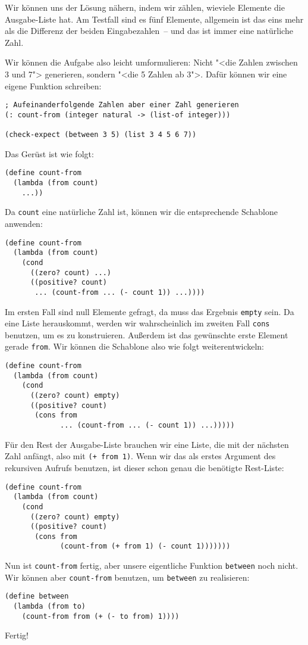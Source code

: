 Wir können uns der Lösung nähern, indem wir zählen, wieviele Elemente
die Ausgabe-Liste hat.  Am Testfall sind es fünf Elemente, allgemein
ist das eins mehr als die Differenz der beiden Eingabezahlen~-- und
das ist immer eine natürliche Zahl.

Wir können die Aufgabe also leicht umformulieren: Nicht "<die Zahlen
zwischen 3 und 7"> generieren, sondern "<die 5 Zahlen ab 3">.  Dafür
können wir eine eigene Funktion schreiben:
%
\begin{lstlisting}
; Aufeinanderfolgende Zahlen aber einer Zahl generieren
(: count-from (integer natural -> (list-of integer)))

(check-expect (between 3 5) (list 3 4 5 6 7))
\end{lstlisting}
%
Das Gerüst ist wie folgt:
%
\begin{lstlisting}
(define count-from
  (lambda (from count)
    ...))
\end{lstlisting}
%
Da \lstinline{count} eine natürliche Zahl ist, können wir die
entsprechende Schablone anwenden:
%
\begin{lstlisting}
(define count-from
  (lambda (from count)
    (cond
      ((zero? count) ...)
      ((positive? count)
       ... (count-from ... (- count 1)) ...))))
\end{lstlisting}
%
Im ersten Fall sind null Elemente gefragt, da muss das Ergebnis
\lstinline{empty} sein.  Da eine Liste herauskommt, werden wir
wahrscheinlich im zweiten Fall \lstinline{cons} benutzen, um es zu
konstruieren.  Außerdem ist das gewünschte erste Element gerade
\lstinline{from}.  Wir können die Schablone also wie folgt
weiterentwickeln:
%
\begin{lstlisting}
(define count-from
  (lambda (from count)
    (cond
      ((zero? count) empty)
      ((positive? count)
       (cons from
             ... (count-from ... (- count 1)) ...)))))
\end{lstlisting}
%
Für den Rest der Ausgabe-Liste brauchen wir eine Liste, die mit der
nächsten Zahl anfängt, also mit \lstinline{(+ from 1)}.  Wenn wir das
als erstes Argument des rekursiven Aufrufs benutzen, ist dieser schon
genau die benötigte Rest-Liste:
%
\begin{lstlisting}
(define count-from
  (lambda (from count)
    (cond
      ((zero? count) empty)
      ((positive? count)
       (cons from
             (count-from (+ from 1) (- count 1)))))))
\end{lstlisting}
%
Nun ist \lstinline{count-from} fertig, aber unsere eigentliche Funktion
\lstinline{between} noch nicht.  Wir können aber \lstinline{count-from}
benutzen, um \lstinline{between} zu realisieren:
%
\begin{lstlisting}
(define between
  (lambda (from to)
    (count-from from (+ (- to from) 1))))
\end{lstlisting}
%
Fertig!


